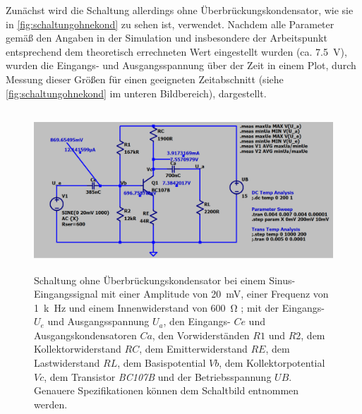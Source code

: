 \documentclass[12pt,english,ngerman]{scrartcl}
\begin{document}
Zunächst wird die Schaltung allerdings ohne Überbrückungskondensator, wie sie
in  \autoref{fig:schaltungohnekond} zu sehen ist, verwendet. Nachdem
alle Parameter gemäß den Angaben in der Simulation und insbesondere der
Arbeitspunkt entsprechend dem theoretisch errechneten Wert eingestellt wurden
(ca. \SI{7.5}{\volt}), wurden die Eingangs- und Ausgangsspannung über der Zeit in
einem Plot, durch Messung dieser Größen für einen geeigneten Zeitabschnitt
(siehe  \autoref{fig:schaltungohnekond} im unteren Bildbereich),
dargestellt. 

\begin{figure}[H]
    \centering
    \includegraphics[width=\textwidth, height=6cm,keepaspectratio]{./figures/ohnekond/schaltungmitmessungen20mv.png}
    \caption{Schaltung ohne Überbrückungskondensator bei einem Sinus-Eingangssignal
    mit einer Amplitude von \SI{20}{mV}, einer Frequenz von \SI{1}{k\hertz} und einem
    Innenwiderstand von \SI{600}{\ohm} ; mit der Eingangs- $U_e$ und
    Ausgangsspannung $U_a$, den Eingangs- $Ce$ und Ausgangskondensatoren $Ca$, den
    Vorwiderständen $R1$ und $R2$, dem Kollektorwiderstand $RC$, dem
    Emitterwiderstand $RE$, dem Lastwiderstand $RL$, dem Basispotential $Vb$, dem
    Kollektorpotential $Vc$, dem Transistor \textit{BC107B} und der
    Betriebsspannung $UB$. Genauere Spezifikationen können dem Schaltbild entnommen
    werden.}
    \label{fig:schaltungohnekond}
\end{figure}

\end{document}
